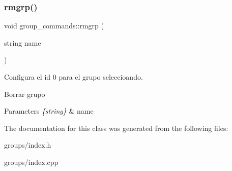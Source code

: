\subsubsection{\texorpdfstring{rmgrp()}{rmgrp()}}
{\footnotesize\ttfamily void group\+\_\+commands\+::rmgrp (\begin{DoxyParamCaption}\item[{string}]{name }\end{DoxyParamCaption})}



Configura el id 0 para el grupo seleccioando. 

Borrar grupo 
\begin{DoxyParams}{Parameters}
{\em \{string\}} & name \\
\hline
\end{DoxyParams}


The documentation for this class was generated from the following files\+:\begin{DoxyCompactItemize}
\item 
groups/index.\+h\item 
groups/index.\+cpp\end{DoxyCompactItemize}
